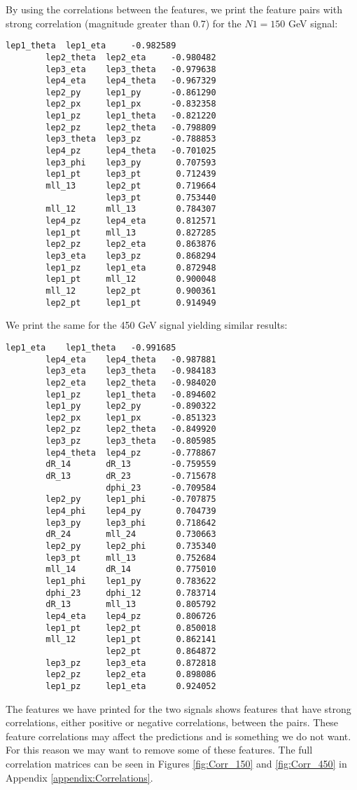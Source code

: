 \documentclass[a4paper, american, 12pt]{report}
\begin{document}
	By using the correlations between the features, we print the feature pairs with strong correlation (magnitude greater than 0.7) for the $N1=150$ GeV signal:
	\begin{lstlisting}[caption=Correlation between the features with magnitude grater than 0.7 for 150 GeV signal dataset.,label=Feature150]
		lep1_theta  lep1_eta     -0.982589
		lep2_theta  lep2_eta     -0.980482
		lep3_eta    lep3_theta   -0.979638
		lep4_eta    lep4_theta   -0.967329
		lep2_py     lep1_py      -0.861290
		lep2_px     lep1_px      -0.832358
		lep1_pz     lep1_theta   -0.821220
		lep2_pz     lep2_theta   -0.798809
		lep3_theta  lep3_pz      -0.788853
		lep4_pz     lep4_theta   -0.701025
		lep3_phi    lep3_py       0.707593
		lep1_pt     lep3_pt       0.712439
		mll_13      lep2_pt       0.719664
					lep3_pt       0.753440
		mll_12      mll_13        0.784307
		lep4_pz     lep4_eta      0.812571
		lep1_pt     mll_13        0.827285
		lep2_pz     lep2_eta      0.863876
		lep3_eta    lep3_pz       0.868294
		lep1_pz     lep1_eta      0.872948
		lep1_pt     mll_12        0.900048
		mll_12      lep2_pt       0.900361
		lep2_pt     lep1_pt       0.914949
	\end{lstlisting}
	We print the same for the 450 GeV signal yielding similar results:
	\begin{lstlisting}[caption=Correlation between the features with magnitude grater than 0.7 for 450 GeV signal dataset.,label=Feature450]
		lep1_eta    lep1_theta   -0.991685
		lep4_eta    lep4_theta   -0.987881
		lep3_eta    lep3_theta   -0.984183
		lep2_eta    lep2_theta   -0.984020
		lep1_pz     lep1_theta   -0.894602
		lep1_py     lep2_py      -0.890322
		lep2_px     lep1_px      -0.851323
		lep2_pz     lep2_theta   -0.849920
		lep3_pz     lep3_theta   -0.805985
		lep4_theta  lep4_pz      -0.778867
		dR_14       dR_13        -0.759559
		dR_13       dR_23        -0.715678
					dphi_23      -0.709584
		lep2_py     lep1_phi     -0.707875
		lep4_phi    lep4_py       0.704739
		lep3_py     lep3_phi      0.718642
		dR_24       mll_24        0.730663
		lep2_py     lep2_phi      0.735340
		lep3_pt     mll_13        0.752684
		mll_14      dR_14         0.775010
		lep1_phi    lep1_py       0.783622
		dphi_23     dphi_12       0.783714
		dR_13       mll_13        0.805792
		lep4_eta    lep4_pz       0.806726
		lep1_pt     lep2_pt       0.850018
		mll_12      lep1_pt       0.862141
					lep2_pt       0.864872
		lep3_pz     lep3_eta      0.872818
		lep2_pz     lep2_eta      0.898086
		lep1_pz     lep1_eta      0.924052
	\end{lstlisting} 
	The features we have printed for the two signals shows features that have strong correlations, either positive or negative correlations, between the pairs. These feature correlations may affect the predictions and is something we do not want. For this reason we may want to remove some of these features. The full correlation matrices can be seen in Figures \ref{fig:Corr_150} and \ref{fig:Corr_450} in Appendix \ref{appendix:Correlations}. 
		
\end{document}
